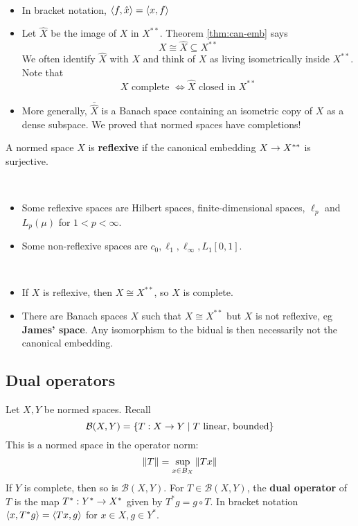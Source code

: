 \documentclass{article}
\begin{document}
\begin{rmks}~
  \begin{itemize}
    \item In bracket notation, $\left\langle f, \hat x\right\rangle = \left\langle x, f\right\rangle$
    \item Let $\hat X$ be the image of $X$ in $X^{**}$. Theorem \ref{thm:can-emb} says
      $$X \cong \hat X \subseteq X^{**}$$
      We often identify $\hat X$ with $X$ and think of $X$ as living isometrically inside $X^{**}$. Note that
      $$X \text{ complete } \iff \hat X \text{ closed in } X^{**}$$
    \item More generally, $\bar{\hat X}$ is a Banach space containing an isometric copy of $X$ as a dense subspace. We proved that normed spaces have completions!
  \end{itemize}
\end{rmks}

\begin{defi}
  A normed space $X$ is {\bf reflexive} if the canonical embedding $X \rightarrow X^{**}$ is surjective.
\end{defi}

\begin{egs}~
  \begin{itemize}
    \item Some reflexive spaces are Hilbert spaces, finite-dimensional spaces, $\ell_p$ and $L_p(\mu)$ for $1 < p < \infty$.
    \item Some non-reflexive spaces are $c_0, \ell_1, \ell_\infty, L_1[0, 1]$.
  \end{itemize}
\end{egs}

\begin{rmks}~
  \begin{itemize}
  \item If $X$ is reflexive, then $X \cong X^{**}$, so $X$ is complete.
  \item There are Banach spaces $X$ such that $X \cong X^{**}$ but $X$ is not reflexive, eg {\bf James' space}. Any isomorphism to the bidual is then necessarily not the canonical embedding.
  \end{itemize}
\end{rmks}

\subsection{Dual operators}

\newlec

Let $X, Y$ be normed spaces. Recall
$$\mathcal B(X, Y) = \{T : X \rightarrow Y \mid T \text{ linear, bounded}\}$$
This is a normed space in the operator norm:
$$\left\lVert T\right\rVert = \sup_{x \in B_X} \left\lVert Tx\right\rVert$$
If $Y$ is complete, then so is $\mathcal B(X, Y)$. For $T \in \mathcal B(X, Y)$, the {\bf dual operator} of $T$ is the map $T^* : Y^* \rightarrow X^*$ given by $T^*g = g \circ T$. In bracket notation $\left\langle x, T^*g\right\rangle = \left\langle Tx, g\right\rangle$ for $x \in X, g \in Y^*$.
\end{document}
